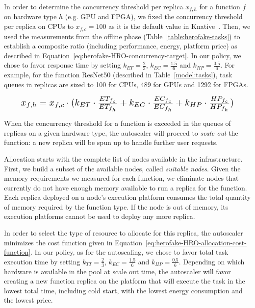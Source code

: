 In order to determine the concurrency threshold per replica $x_{f, h}$ for a function $f$ on hardware type $h$ (e.g. GPU and FPGA), we fixed the concurrency threshold per replica on CPUs to $x_{f, c} = 100$ as it is the default value in Knative~\cite{knative-concurrency}. Then, we used the measurements from the offline phase (Table~\ref{table:herofake-tasks}) to establish a composite ratio (including performance, energy, platform price) as described in Equation~\ref{eq:herofake-HRO-concurrency-target}. In our policy, we chose to favor response time by setting $k_{ET} = \frac{2}{3}$, $k_{EC} = \frac{1.5}{6}$ and $k_{HP} = \frac{0.5}{6}$. For example, for the function ResNet50 (described in Table~\ref{model:tasks}), task queues in replicas are sized to 100 for CPUs, 489 for GPUs and 1292 for FPGAs.

\begin{equation}
\begin{split}
\resizebox{0.90\columnwidth}{!}{%
    \begin{math}
    x_{f, h} = x_{f, c} \cdot (k_{ET} \cdot \frac{ET_{{f}_{c}}}{ET_{{f}_{h}}} + k_{EC} \cdot \frac{EC_{{f}_{c}}}{EC_{{f}_{h}}} + k_{HP} \cdot \frac{HP_{{f}_{c}}}{HP_{{f}_{h}}})
    \end{math}%
}
\end{split}
\label{eq:herofake-HRO-concurrency-target}
\end{equation}

When the concurrency threshold for a function is exceeded in the queues of replicas on a given hardware type, the autoscaler will proceed to \textit{scale out} the function: a new replica will be spun up to handle further user requests.

Allocation starts with the complete list of nodes available in the infrastructure. First, we build a subset of the available nodes, called \textit{suitable nodes}. Given the memory requirements we measured for each function, we eliminate nodes that currently do not have enough memory available to run a replica for the function. Each replica deployed on a node's execution platform consumes the total quantity of memory required by the function type. If the node is out of memory, its execution platforms cannot be used to deploy any more replica.

In order to select the type of resource to allocate for this replica, the autoscaler minimizes the cost function given in Equation~\ref{eq:herofake-HRO-allocation-cost-function}. 
In our policy, as for the autoscaling, we chose to favor total task execution time by setting $k_{TT} = \frac{2}{3}$, $k_{EC} = \frac{1.5}{6}$ and $k_{HP} = \frac{0.5}{6}$. 
Depending on which hardware is available in the pool at scale out time, the autoscaler will favor creating a new function replica on the platform that will execute the task in the lowest total time, including cold start, with the lowest energy consumption and the lowest price.


